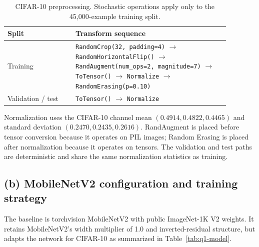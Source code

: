 \documentclass[12pt,a4paper]{article}
\begin{document}
\begin{table}[H]
    \centering
    \small
    \caption{CIFAR-10 preprocessing. Stochastic operations apply only to the 45,000-example training split.}
    \label{tab:q1-transforms}
    \begin{tabular}{p{0.27\linewidth}p{0.61\linewidth}}
        \toprule
        Split & Transform sequence \\
        \midrule
        Training & \texttt{RandomCrop(32, padding=4)} $\rightarrow$
        \texttt{RandomHorizontalFlip()} $\rightarrow$
        \texttt{RandAugment(num\_ops=2, magnitude=7)} $\rightarrow$
        \texttt{ToTensor()} $\rightarrow$ \texttt{Normalize} $\rightarrow$
        \texttt{RandomErasing(p=0.10)} \\
        Validation / test & \texttt{ToTensor()} $\rightarrow$ \texttt{Normalize} \\
        \bottomrule
    \end{tabular}
\end{table}

Normalization uses the CIFAR-10 channel mean $(0.4914, 0.4822, 0.4465)$ and
standard deviation $(0.2470, 0.2435, 0.2616)$. RandAugment is placed before
tensor conversion because it operates on PIL images; Random Erasing is placed
after normalization because it operates on tensors. The validation and test
paths are deterministic and share the same normalization statistics as training.

\subsection{(b) MobileNetV2 configuration and training strategy}

The baseline is torchvision MobileNetV2 with public ImageNet-1K V2 weights.
It retains MobileNetV2's width multiplier of 1.0 and inverted-residual
structure, but adapts the network for CIFAR-10 as summarized in
Table~\ref{tab:q1-model}.
\end{document}
